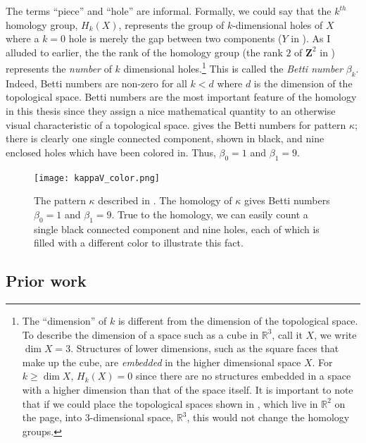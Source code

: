 The terms ``piece'' and ``hole'' are informal. Formally, we could say that the $k^{th}$ homology group, $H_k(X)$, represents the group of $k$-dimensional holes of $X$ where a $k = 0$ hole is merely the gap between two components (\eg $Y$ in ). As I alluded to earlier, the the rank of the homology group (\eg the rank $2$ of $\mathbf{Z}^2$ in ) represents the \emph{number} of $k$ dimensional holes.\footnote{The ``dimension'' of $k$ is different from the dimension of the topological space. To describe the dimension of a space such as a cube in $\mathbb{R}^3$, call it $X$, we write $\dim X = 3$. Structures of lower dimensions, such as the square faces that make up the cube, are \textit{embedded} in the higher dimensional space $X$. For $k \geq \dim X$, $H_k(X) = 0$ since there are no structures embedded in a space with a higher dimension than that of the space itself. It is important to note that if we could place the topological spaces shown in , which live in $\mathbb{R}^2$ on the page, into 3-dimensional space, $\mathbb{R}^3$, this would not change the homology groups.} This is called the \textit{Betti number} $\beta_k$. Indeed, Betti numbers are non-zero for all $k < d$ where $d$ is the dimension of the topological space. Betti numbers are the most important feature of the homology in this thesis since they assign a nice mathematical quantity to an otherwise visual characteristic of a topological space.  gives the Betti numbers for pattern $\kappa$; there is clearly one single connected component, shown in black, and nine enclosed holes which have been colored in. Thus, $\beta_0 = 1$ and $\beta_1 = 9$.
%
\begin{figure}
	\centering
	\texttt{[image: kappaV\_color.png]}
	\caption{\label{fig:kappaV_color} The pattern $\kappa$ described in . The homology of $\kappa$ gives Betti numbers $\beta_0 = 1$ and $\beta_1 = 9$. True to the homology, we can easily count a single black connected component and nine holes, each of which is filled with a different color to illustrate this fact.}
\end{figure}

\subsection{Prior work}

